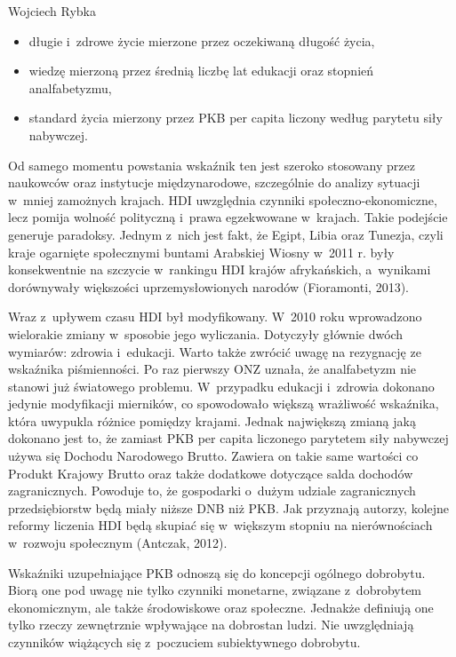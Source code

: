 \begin{artplenv}{Wojciech Rybka}
\begin{itemize}
\item długie i~zdrowe życie mierzone przez oczekiwaną długość życia,
\item wiedzę mierzoną przez średnią liczbę lat edukacji oraz stopnień analfabetyzmu,
\item standard życia mierzony przez PKB per capita liczony według parytetu siły nabywczej.
\end{itemize}

Od samego momentu powstania wskaźnik ten jest szeroko stosowany przez naukowców oraz instytucje międzynarodowe,
szczególnie do analizy sytuacji w~mniej zamożnych krajach. HDI uwzględnia czynniki społeczno-ekonomiczne, lecz pomija
wolność polityczną i~prawa egzekwowane w~krajach. Takie podejście generuje paradoksy. Jednym z~nich jest fakt, że
Egipt, Libia oraz Tunezja, czyli kraje ogarnięte społecznymi buntami Arabskiej Wiosny w~2011 r. były konsekwentnie na
szczycie w~rankingu HDI krajów afrykańskich, a~wynikami dorównywały większości uprzemysłowionych narodów
\label{ref:RNDelLCkdjsXg}(Fioramonti, 2013).

Wraz z~upływem czasu HDI był modyfikowany. W~2010 roku wprowadzono wielorakie zmiany w~sposobie jego wyliczania.
Dotyczyły głównie dwóch wymiarów: zdrowia i~edukacji. Warto także zwrócić uwagę na rezygnację ze wskaźnika
piśmienności. Po raz pierwszy ONZ uznała, że analfabetyzm nie stanowi już światowego problemu. W~przypadku
edukacji i~zdrowia dokonano jedynie modyfikacji mierników, co spowodowało większą wrażliwość wskaźnika, która uwypukla różnice
pomiędzy krajami. Jednak największą zmianą jaką dokonano jest to, że zamiast PKB per capita liczonego parytetem siły
nabywczej używa się Dochodu Narodowego Brutto. Zawiera on takie same wartości co Produkt Krajowy Brutto oraz także
dodatkowe dotyczące salda dochodów zagranicznych. Powoduje to, że gospodarki o~dużym udziale zagranicznych
przedsiębiorstw będą miały niższe DNB niż PKB. Jak przyznają autorzy, kolejne reformy liczenia HDI będą skupiać
się w~większym stopniu na nierównościach w~rozwoju społecznym
\label{ref:RND2pfZeWyV55}(Antczak, 2012).

Wskaźniki uzupełniające PKB odnoszą się do koncepcji ogólnego dobrobytu. Biorą one pod uwagę nie tylko czynniki
monetarne, związane z~dobrobytem ekonomicznym, ale także środowiskowe oraz społeczne. Jednakże definiują one tylko
rzeczy zewnętrznie wpływające na dobrostan ludzi. Nie uwzględniają czynników wiążących się z~poczuciem subiektywnego
dobrobytu.


\end{artplenv}
